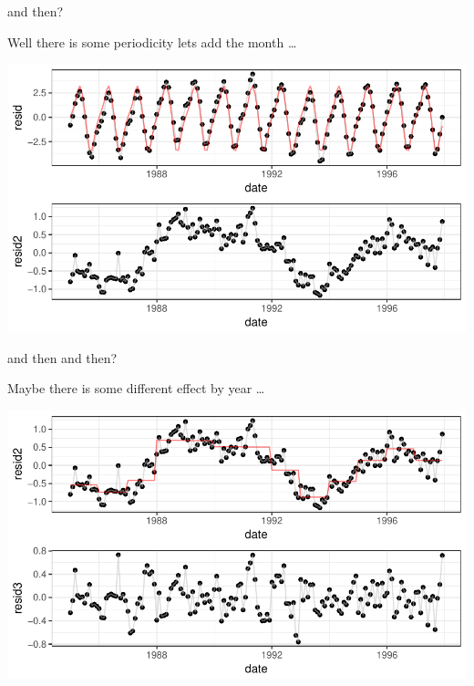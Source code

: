 \documentclass[11pt,ignorenonframetext,]{beamer}
\begin{document}
\begin{frame}{and then?}

Well there is some periodicity lets add the month \ldots{}

\pause

\includegraphics{Lec3_files/figure-beamer/unnamed-chunk-3-1.pdf}

\end{frame}

\begin{frame}{and then and then?}

Maybe there is some different effect by year \ldots{}

\pause

\includegraphics{Lec3_files/figure-beamer/unnamed-chunk-4-1.pdf}

\end{frame}
\end{document}
